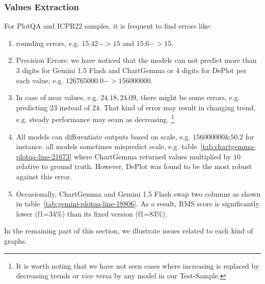 \documentclass[
	letterpaper, %
]{jdf}
\begin{document}
\subsubsection{Values Extraction}\label{sssect:values-extraction}
For PlotQA and ICPR22 samples, it is frequent to find errors like:
\begin{enumerate}
     \item rounding errors, e.g. $15.42->15$ and $15.6->15$.
     \item Precision Errors: we have noticed that the models can not predict more than 3 digits for Gemini 1.5 Flash and ChartGemma or 4 digits for DePlot per each value, e.g. $126765000.0->156000000$.
     \item In case of near values, e.g. $24.18, 24.09$, there might be some errors, e.g. predicting $23$ instead of $24$.
       That kind of error may result in changing trend, e.g. steady performance may seam as decreasing.
       \footnote{It is worth noting that we have not seen cases where increasing is replaced by decreasing trends or vice versa by any model in our Test-Sample.}
       \item All models can differentiate outputs based on scale, e.g. $156000000 \& 50.2$ for instance.
all models sometimes mispredict scale, e.g. table~\ref{tab:chartgemma-plotqa-line-21673} where ChartGemma returned values multiplied by $10$ relative to ground truth.
However, DePlot was found to be the most robust against this error.
       \item Occasionally, ChartGemma and Gemini 1.5 Flash swap two columns as shown in table~\ref{tab:gemini-plotqa-line-18806}.
         As a result, RMS score is significantly lower (f1=$34\%$) than its fixed version (f1=$83\%$).
       \end{enumerate}

In the remaining part of this section, we illustrate issues related to each kind of graphs.
\end{document}
